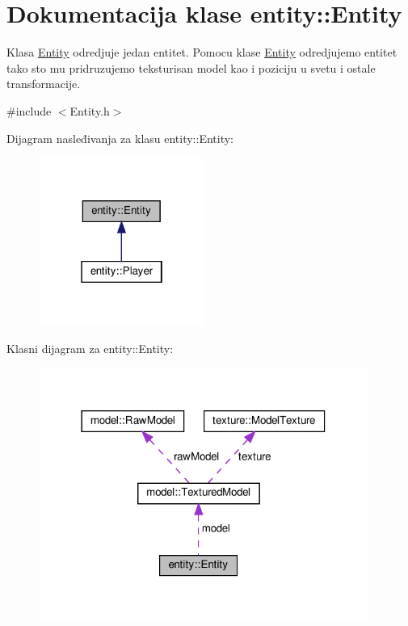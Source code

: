 \hypertarget{classentity_1_1Entity}{}\section{Dokumentacija klase entity\+:\+:Entity}
\label{classentity_1_1Entity}


Klasa \hyperlink{classentity_1_1Entity}{Entity} odredjuje jedan entitet. Pomocu klase \hyperlink{classentity_1_1Entity}{Entity} odredjujemo entitet tako sto mu pridruzujemo teksturisan model kao i poziciju u svetu i ostale transformacije.  




{\ttfamily \#include $<$Entity.\+h$>$}



Dijagram nasleđivanja za klasu entity\+:\+:Entity\+:\nopagebreak
\begin{figure}[H]
\begin{center}
\leavevmode
\includegraphics[width=154pt]{classentity_1_1Entity__inherit__graph}
\end{center}
\end{figure}


Klasni dijagram za entity\+:\+:Entity\+:\nopagebreak
\begin{figure}[H]
\begin{center}
\leavevmode
\includegraphics[width=306pt]{classentity_1_1Entity__coll__graph}
\end{center}
\end{figure}
